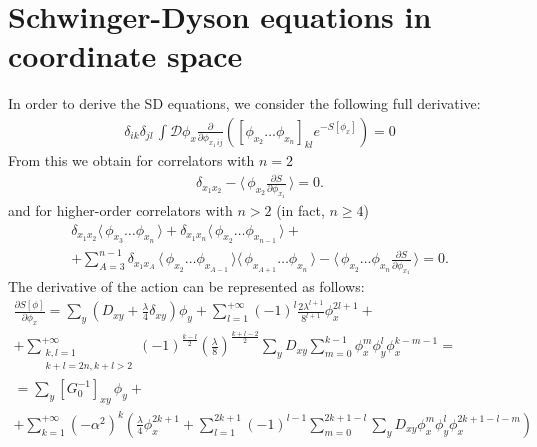 \documentclass[12pt]{article}
\newcommand{\lr}[1]{ \left( #1 \right) }
\newcommand{\lrs}[1]{ \left[ #1 \right] }
\newcommand{\vev}[1]{ \langle \, #1 \, \rangle }
\begin{document}
\section{Schwinger-Dyson equations in coordinate space}
\label{sec:sd_coordinate}

 In order to derive the SD equations, we consider the following full derivative:
\begin{eqnarray}
\label{sd_eqs0}
 \delta_{ik} \delta_{jl} \, \int \mathcal{D}\phi_x \frac{\partial}{\partial \phi_{x_1 \, ij}}
 \lr{
 \lrs{\phi_{x_2} \ldots \phi_{x_n}}_{kl} e^{-S\lrs{\phi_x}}
 } = 0
\end{eqnarray}
From this we obtain for correlators with $n = 2$
\begin{eqnarray}
\label{sd_eqs_G2_coord}
 \delta_{x_1 x_2} - \vev{\phi_{x_2} \frac{\partial S}{\partial \phi_{x_1}} } = 0 .
\end{eqnarray}
and for higher-order correlators with $n > 2$ (in fact, $n \geq 4$)
\begin{eqnarray}
\label{sd_eqs_Gn_coord}
 \delta_{x_1 x_2} \vev{\phi_{x_3} \ldots \phi_{x_n}}
 +
 \delta_{x_1 x_n} \vev{\phi_{x_2} \ldots \phi_{x_{n-1}}}
 + \nonumber \\ +
 \sum\limits_{A=3}^{n-1} \delta_{x_1 x_A} \,
 \vev{\phi_{x_2} \ldots \phi_{x_{A-1}}}
 \vev{\phi_{x_{A+1}} \ldots \phi_{x_n}}
 -
 \vev{\phi_{x_2} \ldots \phi_{x_n} \frac{\partial S}{\partial \phi_{x_1}} } = 0 .
\end{eqnarray}
The derivative of the action can be represented as follows:
\begin{eqnarray}
\label{dSdphi_coord}
 \frac{\partial S\lrs{\phi}}{\partial \phi_x}
 =
 \sum\limits_{y} \lr{D_{xy} + \frac{\lambda}{4} \delta_{x y}} \phi_y
 +
 \sum\limits_{l=1}^{+\infty} \lr{-1}^l \frac{2 \lambda^{l+1}}{8^{l+1}} \phi_x^{2 l + 1}
 + \nonumber \\ +
 \sum\limits_{\substack{k,l=1\\k+l=2 n,k+l>2}}^{+\infty}
 \lr{-1}^{\frac{k-l}{2}} \lr{\frac{\lambda}{8}}^{\frac{k+l-2}{2}}
 \sum\limits_y D_{x y}
 \sum\limits_{m=0}^{k-1}
 \phi_x^m \phi_y^l \phi_x^{k-m-1}
 = \nonumber \\ =
 \sum\limits_y \lrs{G_0^{-1}}_{x y} \, \phi_y
 + \nonumber \\ +
 \sum\limits_{k=1}^{+\infty} \lr{-\alpha^2}^k
 \lr{
  \frac{\lambda}{4} \phi_x^{2 k + 1}
  +
  \sum\limits_{l=1}^{2 k + 1} \lr{-1}^{l-1}
  \sum\limits_{m=0}^{2 k + 1 - l}
  \sum\limits_y D_{x y}
  \phi_x^m \phi_y^l \phi_x^{2 k + 1 - l - m}
 }
\end{eqnarray}
\end{document}
